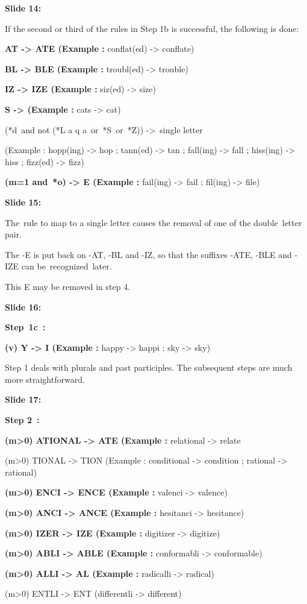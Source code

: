 \documentclass[11pt,a4paper]{article}
\begin{document}
\textbf{Slide 14:}

If the second or third of the rules in Step 1b is successful, the following is done:

\textbf{AT -> ATE (Example :}  conflat(ed) -> conflate)

\textbf{BL -> BLE (Example :}  troubl(ed) -> trouble)

\textbf{IZ -> IZE (Example :}  siz(ed) -> size)

\textbf{S -> (Example :}  cats -> cat)

(*d and not (*L a q a or *S or *Z)) -> single letter

(Example : hopp(ing) -> hop ; tann(ed) -> tan ; fall(ing) -> fall ; hiss(ing) -> hiss ; fizz(ed) -> fizz)

\textbf{(m=1 and *o) -> E (Example :}  fail(ing) -> fail ; fil(ing) -> file)

\textbf{Slide 15:}

The rule to map to a single letter causes the removal of one of the double letter pair.

The -E is put back on -AT, -BL and -IZ, so that the suffixes -ATE, -BLE and -IZE can be recognized later.

This E may be removed in step 4.

\textbf{Slide 16:}

\textbf{Step 1c :} 

\textbf{(\*v\*) Y -> I (Example :}  happy -> happi ; sky -> sky)

Step 1 deals with plurals and past participles. The subsequent steps are much more straightforward.

\textbf{Slide 17:}

\textbf{Step 2 :} 

\textbf{(m>0) ATIONAL -> ATE (Example :}  relational -> relate

(m>0) TIONAL -> TION (Example : conditional -> condition ; rational -> rational)

\textbf{(m>0) ENCI -> ENCE (Example :}  valenci -> valence)

\textbf{(m>0) ANCI -> ANCE (Example :}  hesitanci -> hesitance)

\textbf{(m>0) IZER -> IZE (Example :}  digitizer -> digitize)

\textbf{(m>0) ABLI -> ABLE (Example :}  conformabli -> conformable)

\textbf{(m>0) ALLI -> AL (Example :}  radicalli -> radical)

(m>0) ENTLI -> ENT (differentli -> different)
\end{document}

